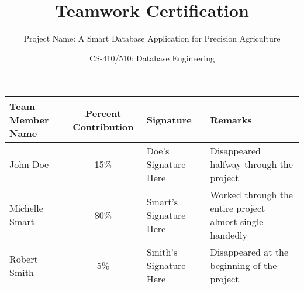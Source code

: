 \documentclass[landscape, 11pt]{article}
\begin{document}
\title{Teamwork Certification}
\author{Project Name: A Smart Database Application for Precision Agriculture}
\date{CS-410/510: Database Engineering}
\maketitle
       

\begin{tabular}{lclp{3.5in}}
\toprule
\textbf{Team Member Name} & \textbf{Percent Contribution} & \textbf{Signature} & \textbf{Remarks} \\ \toprule

John Doe & 15\% & Doe's Signature Here & Disappeared halfway through the project \\ \midrule

Michelle Smart & 80\% & Smart's Signature Here & Worked through the entire project almost single handedly \\ \midrule

Robert Smith & 5\% & Smith's Signature Here & Disappeared at the beginning of the project \\ \bottomrule

\end{tabular}
\end{document}
